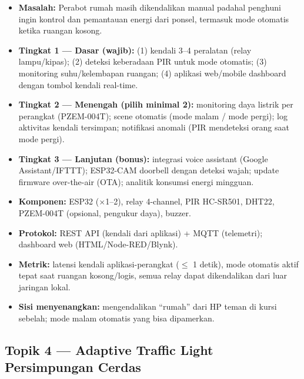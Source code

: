 \documentclass[11pt,a4paper]{article}
\begin{document}
\begin{itemize}
  \item \textbf{Masalah:} Perabot rumah masih dikendalikan manual padahal
        penghuni ingin kontrol dan pemantauan energi dari ponsel, termasuk
        mode otomatis ketika ruangan kosong.
  \item \textbf{Tingkat 1 --- Dasar (wajib):} (1) kendali 3--4 peralatan
        (relay lampu/kipas); (2) deteksi keberadaan PIR untuk mode otomatis;
        (3) monitoring suhu/kelembapan ruangan; (4) aplikasi web/mobile
        dashboard dengan tombol kendali real-time.
  \item \textbf{Tingkat 2 --- Menengah (pilih minimal 2):} monitoring daya
        listrik per perangkat (PZEM-004T); scene otomatis (mode malam / mode
        pergi); log aktivitas kendali tersimpan; notifikasi anomali (PIR
        mendeteksi orang saat mode pergi).
  \item \textbf{Tingkat 3 --- Lanjutan (bonus):} integrasi voice assistant
        (Google Assistant/IFTTT); ESP32-CAM doorbell dengan deteksi wajah;
        update firmware over-the-air (OTA); analitik konsumsi energi mingguan.
  \item \textbf{Komponen:} ESP32 ($\times$1--2), relay 4-channel, PIR HC-SR501,
        DHT22, PZEM-004T (opsional, pengukur daya), buzzer.
  \item \textbf{Protokol:} REST API (kendali dari aplikasi) + MQTT (telemetri);
        dashboard web (HTML/Node-RED/Blynk).
  \item \textbf{Metrik:} latensi kendali aplikasi-perangkat ($\leq$ 1 detik),
        mode otomatis aktif tepat saat ruangan kosong/logis, semua relay
        dapat dikendalikan dari luar jaringan lokal.
  \item \textbf{Sisi menyenangkan:} mengendalikan ``rumah'' dari HP teman di
        kursi sebelah; mode malam otomatis yang bisa dipamerkan.
\end{itemize}

\subsection*{Topik 4 --- Adaptive Traffic Light Persimpungan Cerdas}
\end{document}
